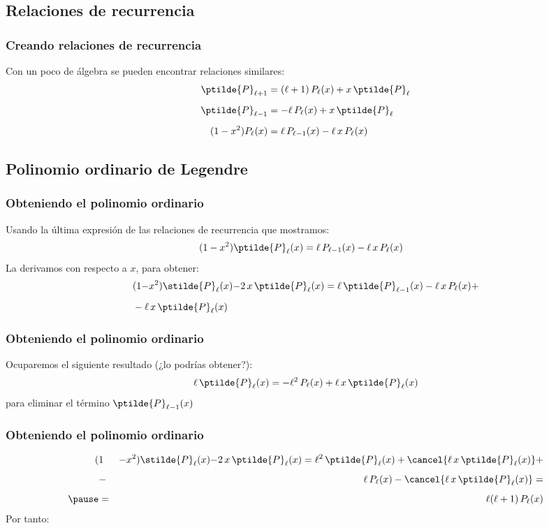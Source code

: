 \subsection{Relaciones de recurrencia}
\begin{frame}
\frametitle{Creando relaciones de recurrencia}
Con un poco de álgebra se pueden encontrar relaciones similares:
\begin{align*}
\ptilde{P}_{\ell+1} &= (\ell + 1) \, P_{\ell}(x) + x \, \ptilde{P}_{\ell} \\[0.5em]
\ptilde{P}_{\ell-1} &= - \ell \, P_{\ell}(x) + x \, \ptilde{P}_{\ell} \\[0.5em]
(1 - x^{2}) P_\ell (x) &= \ell \, P_{\ell-1} (x) - \ell \, x \, P_{\ell} (x)
\end{align*}
\end{frame}
\subsection{Polinomio ordinario de Legendre}
\begin{frame}
\frametitle{Obteniendo el polinomio ordinario}
Usando la última expresión de las relaciones de recurrencia que mostramos:
\begin{align*}
(1 - x^{2}) \ptilde{P}_\ell (x) &= \ell \, P_{\ell-1} (x) - \ell \, x \, P_{\ell} (x)
\end{align*}
\pause
La derivamos con respecto a $x$, para obtener:
\begin{align*}
&(1 {-} x^{2}) \stilde{P}_\ell (x) {-} 2 \, x \, \ptilde{P}_\ell (x) = \ell \, \ptilde{P}_{\ell-1} (x) - \ell \, x \, P_{\ell} (x) + \\[0.5em]
&- \ell \, x \, \ptilde{P}_{\ell}(x)
\end{align*}
\end{frame}
\begin{frame}
\frametitle{Obteniendo el polinomio ordinario}
Ocuparemos el siguiente resultado \pause (¿lo podrías obtener?):
\begin{align*}
\ell \, \ptilde{P}_{\ell} (x) = - \ell^{2} \, P_{\ell} (x) +  \ell \, x \, \ptilde{P}_{\ell} (x)
\end{align*}
para eliminar el término $\ptilde{P}_{\ell-1} (x)$
\end{frame}
\begin{frame}
\frametitle{Obteniendo el polinomio ordinario}
\begin{eqnarray*}
(&1& {-} x^{2}) \stilde{P}_\ell (x) {-} 2 \, x \, \ptilde{P}_\ell (x) = \ell^{2} \, \ptilde{P}_{\ell} (x) + \cancel{\ell \, x \, \ptilde{P}_{\ell} (x)} + \\[0.5em]
&-& \ell \, P_{\ell}(x) - \cancel{\ell \, x \, \ptilde{P}_{\ell}(x)} = \\[0.5em] \pause
&=& \ell (\ell + 1) \, P_{\ell} (x)
\end{eqnarray*}
Por tanto:
\end{frame}
